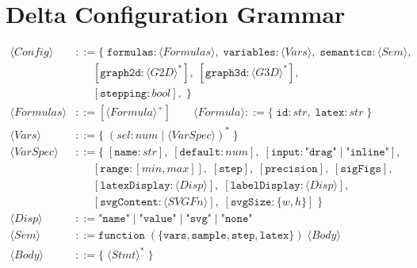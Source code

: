 \clearpage

\section{Delta Configuration Grammar}

\noindent\begin{minipage}{\textwidth}
  \small
  \begin{align*}
  \langle \textit{Config} \rangle &::= \{ \; \texttt{formulas}: \langle \textit{Formulas} \rangle, \;
      \texttt{variables}: \langle \textit{Vars} \rangle, \;
      \texttt{semantics}: \langle \textit{Sem} \rangle, \\
      &\quad\;\; [\texttt{graph2d}: \langle \textit{G2D} \rangle^*], \;
      [\texttt{graph3d}: \langle \textit{G3D} \rangle^*], \\
      &\quad\;\; [\texttt{stepping}: \textit{bool}], \; \} \\[3pt]
  \langle \textit{Formulas} \rangle &::= [\langle \textit{Formula} \rangle^+] \qquad
  \langle \textit{Formula} \rangle ::= \{ \; \texttt{id}: \textit{str}, \; \texttt{latex}: \textit{str} \; \} \\[3pt]
  \langle \textit{Vars} \rangle &::= \{ \; (\textit{sel} : \textit{num} \mid \langle \textit{VarSpec} \rangle)^* \; \} \\
  \langle \textit{VarSpec} \rangle &::= \{ \; [\texttt{name}: \textit{str}], \;
      [\texttt{default}: \textit{num}], \;
      [\texttt{input}: \texttt{"drag"} \mid \texttt{"inline"}], \\
      &\quad\;\; [\texttt{range}: [\textit{min}, \textit{max}]], \;
      [\texttt{step}], \; [\texttt{precision}], \; [\texttt{sigFigs}], \\
      &\quad\;\; [\texttt{latexDisplay}: \langle \textit{Disp} \rangle], \;
      [\texttt{labelDisplay}: \langle \textit{Disp} \rangle], \\
      &\quad\;\; [\texttt{svgContent}: \langle \textit{SVGFn} \rangle], \;
      [\texttt{svgSize}: \{w,h\}] \; \} \\
  \langle \textit{Disp} \rangle &::= \texttt{"name"} \mid \texttt{"value"} \mid \texttt{"svg"} \mid \texttt{"none"} \\[3pt]
  \langle \textit{Sem} \rangle &::= \texttt{function} \; (\{ \texttt{vars}, \texttt{sample}, \texttt{step}, \texttt{latex} \}) \; \langle \textit{Body} \rangle \\
  \langle \textit{Body} \rangle &::= \{ \; \langle \textit{Stmt} \rangle^* \; \} \\

\end{align*}
\end{minipage}
